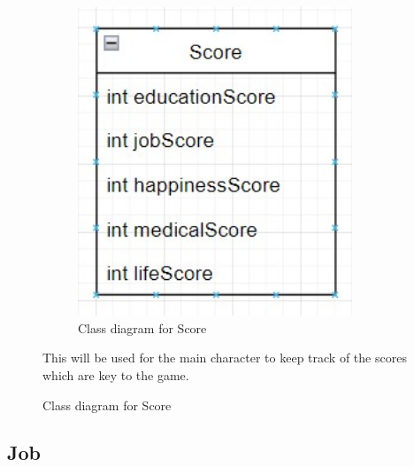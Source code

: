 \begin{figure} [H]
    \centering
    \begin{minipage}{0.45\textwidth}
        \begin{figure}[H]
        \centering
        \includegraphics[width=0.9\textwidth]{images/design/class-score.jpg}
        \caption{Class diagram for Score}
        \label{fig:design-class-score}
        \end{figure}
    \end{minipage} \hfill
    \begin{minipage}{0.45\textwidth}
        This will be used for the main character to keep track of the scores which are key to the game.
    \end{minipage}
\end{figure}

\subsection{Job}

